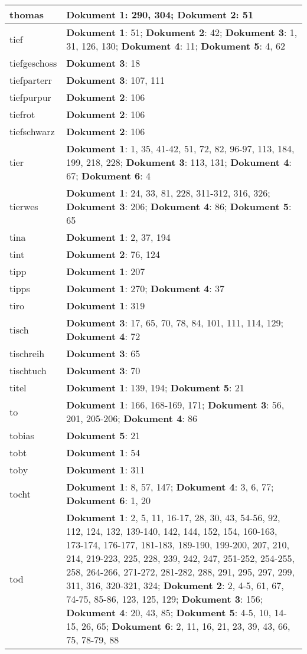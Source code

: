 \documentclass[a5paper]{article}
\begin{document}
\begin{longtable}[l]{|l|p{3in}|}
\hline
thomas & \textbf{Dokument 1}: 290, 304; \textbf{Dokument 2}: 51 \\
\hline
tief & \textbf{Dokument 1}: 51; \textbf{Dokument 2}: 42; \textbf{Dokument 3}: 1, 31, 126, 130; \textbf{Dokument 4}: 11; \textbf{Dokument 5}: 4, 62 \\
\hline
tiefgeschoss & \textbf{Dokument 3}: 18 \\
\hline
tiefparterr & \textbf{Dokument 3}: 107, 111 \\
\hline
tiefpurpur & \textbf{Dokument 2}: 106 \\
\hline
tiefrot & \textbf{Dokument 2}: 106 \\
\hline
tiefschwarz & \textbf{Dokument 2}: 106 \\
\hline
tier & \textbf{Dokument 1}: 1, 35, 41-42, 51, 72, 82, 96-97, 113, 184, 199, 218, 228; \textbf{Dokument 3}: 113, 131; \textbf{Dokument 4}: 67; \textbf{Dokument 6}: 4 \\
\hline
tierwes & \textbf{Dokument 1}: 24, 33, 81, 228, 311-312, 316, 326; \textbf{Dokument 3}: 206; \textbf{Dokument 4}: 86; \textbf{Dokument 5}: 65 \\
\hline
tina & \textbf{Dokument 1}: 2, 37, 194 \\
\hline
tint & \textbf{Dokument 2}: 76, 124 \\
\hline
tipp & \textbf{Dokument 1}: 207 \\
\hline
tipps & \textbf{Dokument 1}: 270; \textbf{Dokument 4}: 37 \\
\hline
tiro & \textbf{Dokument 1}: 319 \\
\hline
tisch & \textbf{Dokument 3}: 17, 65, 70, 78, 84, 101, 111, 114, 129; \textbf{Dokument 4}: 72 \\
\hline
tischreih & \textbf{Dokument 3}: 65 \\
\hline
tischtuch & \textbf{Dokument 3}: 70 \\
\hline
titel & \textbf{Dokument 1}: 139, 194; \textbf{Dokument 5}: 21 \\
\hline
to & \textbf{Dokument 1}: 166, 168-169, 171; \textbf{Dokument 3}: 56, 201, 205-206; \textbf{Dokument 4}: 86 \\
\hline
tobias & \textbf{Dokument 5}: 21 \\
\hline
tobt & \textbf{Dokument 1}: 54 \\
\hline
toby & \textbf{Dokument 1}: 311 \\
\hline
tocht & \textbf{Dokument 1}: 8, 57, 147; \textbf{Dokument 4}: 3, 6, 77; \textbf{Dokument 6}: 1, 20 \\
\hline
tod & \textbf{Dokument 1}: 2, 5, 11, 16-17, 28, 30, 43, 54-56, 92, 112, 124, 132, 139-140, 142, 144, 152, 154, 160-163, 173-174, 176-177, 181-183, 189-190, 199-200, 207, 210, 214, 219-223, 225, 228, 239, 242, 247, 251-252, 254-255, 258, 264-266, 271-272, 281-282, 288, 291, 295, 297, 299, 311, 316, 320-321, 324; \textbf{Dokument 2}: 2, 4-5, 61, 67, 74-75, 85-86, 123, 125, 129; \textbf{Dokument 3}: 156; \textbf{Dokument 4}: 20, 43, 85; \textbf{Dokument 5}: 4-5, 10, 14-15, 26, 65; \textbf{Dokument 6}: 2, 11, 16, 21, 23, 39, 43, 66, 75, 78-79, 88 \\

\end{longtable}
\end{document}
